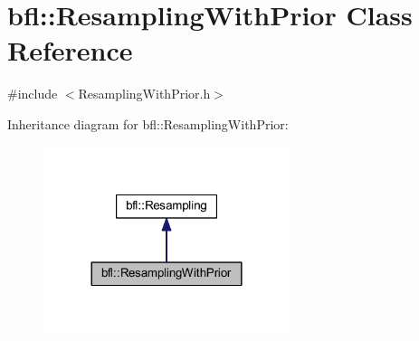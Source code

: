 \hypertarget{classbfl_1_1ResamplingWithPrior}{}\section{bfl\+:\+:Resampling\+With\+Prior Class Reference}
\label{classbfl_1_1ResamplingWithPrior}


{\ttfamily \#include $<$Resampling\+With\+Prior.\+h$>$}



Inheritance diagram for bfl\+:\+:Resampling\+With\+Prior\+:
\nopagebreak
\begin{figure}[H]
\begin{center}
\leavevmode
\includegraphics[width=204pt]{classbfl_1_1ResamplingWithPrior__inherit__graph}
\end{center}
\end{figure}

